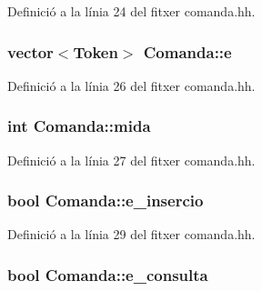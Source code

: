 Definició a la línia 24 del fitxer comanda.\-hh.

\hypertarget{class_comanda_a4792137ffe62e366d017c085798e1de7}{
\subsubsection[{e}]{\setlength{\rightskip}{0pt plus 5cm}vector$<${\bf Token}$>$ Comanda\-::e\hspace{0.3cm}{\ttfamily [private]}}}\label{class_comanda_a4792137ffe62e366d017c085798e1de7}


Definició a la línia 26 del fitxer comanda.\-hh.

\hypertarget{class_comanda_abaf613f247586557027ad5857ace89c2}{
\subsubsection[{mida}]{\setlength{\rightskip}{0pt plus 5cm}int Comanda\-::mida\hspace{0.3cm}{\ttfamily [private]}}}\label{class_comanda_abaf613f247586557027ad5857ace89c2}


Definició a la línia 27 del fitxer comanda.\-hh.

\hypertarget{class_comanda_afa50474d0c9c08da1f3042cfddc9df24}{
\subsubsection[{e\-\_\-insercio}]{\setlength{\rightskip}{0pt plus 5cm}bool Comanda\-::e\-\_\-insercio\hspace{0.3cm}{\ttfamily [private]}}}\label{class_comanda_afa50474d0c9c08da1f3042cfddc9df24}


Definició a la línia 29 del fitxer comanda.\-hh.

\hypertarget{class_comanda_a558a2944c2306c12df9f889fc96a58dd}{
\subsubsection[{e\-\_\-consulta}]{\setlength{\rightskip}{0pt plus 5cm}bool Comanda\-::e\-\_\-consulta\hspace{0.3cm}{\ttfamily [private]}}}\label{class_comanda_a558a2944c2306c12df9f889fc96a58dd}


